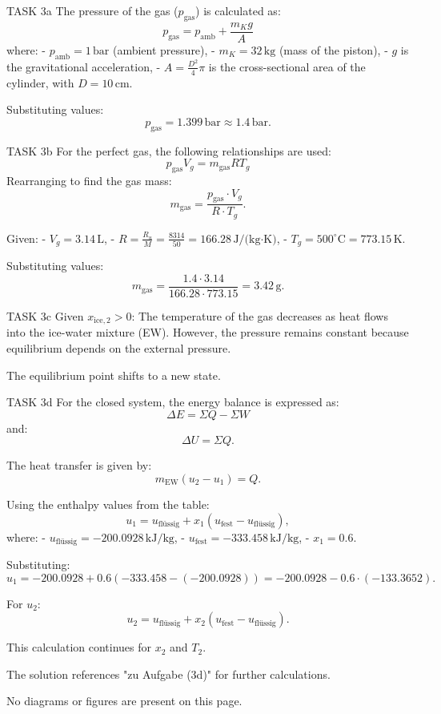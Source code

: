 TASK 3a  
The pressure of the gas (\( p_{\text{gas}} \)) is calculated as:  
\[
p_{\text{gas}} = p_{\text{amb}} + \frac{m_K g}{A}
\]  
where:  
- \( p_{\text{amb}} = 1 \, \text{bar} \) (ambient pressure),  
- \( m_K = 32 \, \text{kg} \) (mass of the piston),  
- \( g \) is the gravitational acceleration,  
- \( A = \frac{D^2}{4} \pi \) is the cross-sectional area of the cylinder, with \( D = 10 \, \text{cm} \).  

Substituting values:  
\[
p_{\text{gas}} = 1.399 \, \text{bar} \approx 1.4 \, \text{bar}.
\]  

TASK 3b  
For the perfect gas, the following relationships are used:  
\[
p_{\text{gas}} V_g = m_{\text{gas}} R T_g
\]  
Rearranging to find the gas mass:  
\[
m_{\text{gas}} = \frac{p_{\text{gas}} \cdot V_g}{R \cdot T_g}.
\]  

Given:  
- \( V_g = 3.14 \, \text{L} \),  
- \( R = \frac{R_u}{M} = \frac{8314}{50} = 166.28 \, \text{J/(kg·K)} \),  
- \( T_g = 500^\circ\text{C} = 773.15 \, \text{K} \).  

Substituting values:  
\[
m_{\text{gas}} = \frac{1.4 \cdot 3.14}{166.28 \cdot 773.15} = 3.42 \, \text{g}.
\]  

TASK 3c  
Given \( x_{\text{ice},2} > 0 \):  
The temperature of the gas decreases as heat flows into the ice-water mixture (EW). However, the pressure remains constant because equilibrium depends on the external pressure.  

The equilibrium point shifts to a new state.  

TASK 3d  
For the closed system, the energy balance is expressed as:  
\[
\Delta E = \Sigma Q - \Sigma W
\]  
and:  
\[
\Delta U = \Sigma Q.
\]  

The heat transfer is given by:  
\[
m_{\text{EW}} (u_2 - u_1) = Q.
\]  

Using the enthalpy values from the table:  
\[
u_1 = u_{\text{flüssig}} + x_1 (u_{\text{fest}} - u_{\text{flüssig}}),
\]  
where:  
- \( u_{\text{flüssig}} = -200.0928 \, \text{kJ/kg} \),  
- \( u_{\text{fest}} = -333.458 \, \text{kJ/kg} \),  
- \( x_1 = 0.6 \).  

Substituting:  
\[
u_1 = -200.0928 + 0.6 (-333.458 - (-200.0928)) = -200.0928 - 0.6 \cdot (-133.3652).
\]  

For \( u_2 \):  
\[
u_2 = u_{\text{flüssig}} + x_2 (u_{\text{fest}} - u_{\text{flüssig}}).
\]  

This calculation continues for \( x_2 \) and \( T_2 \).  

The solution references "zu Aufgabe (3d)" for further calculations.  

No diagrams or figures are present on this page.